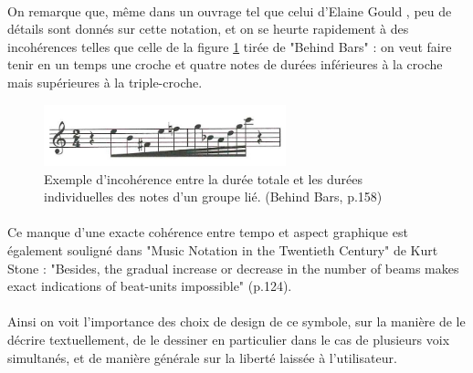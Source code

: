 \documentclass[a4paper,10pt,twocolumn]{article}
\begin{document}

\paragraph{}
On remarque que, même dans un ouvrage tel que celui d'Elaine Gould \cite{ref2}, peu de détails sont donnés sur cette notation, et on se heurte rapidement à des incohérences telles que celle de la figure \ref{fig:incoherence} tirée de "Behind Bars" : on veut faire tenir en un temps une croche et quatre notes de durées inférieures à la croche mais supérieures à la triple-croche. 

\begin{figure}[h]
\centering
\includegraphics[width=7cm]{img/behindbars.jpg}
\caption{Exemple d'incohérence entre la durée totale et les durées individuelles des notes d'un groupe lié. (Behind Bars, p.158) }
\label{fig:incoherence}
\end{figure}

\paragraph{}
Ce manque d'une exacte cohérence entre tempo et aspect graphique est également souligné dans "Music Notation in the Twentieth Century" de Kurt Stone \cite{ref3} : "Besides, the gradual increase or decrease in the number of beams makes exact indications of beat-units impossible" (p.124).

\paragraph{}
Ainsi on voit l'importance des choix de design de ce symbole, sur la manière de le décrire textuellement, de le dessiner en particulier dans le cas de plusieurs voix simultanés, et de manière générale sur la liberté laissée à l'utilisateur.
\\
\end{document}
